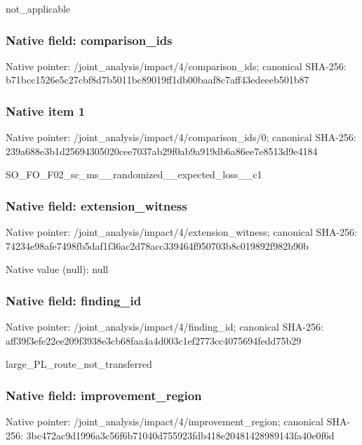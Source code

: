 \documentclass[10pt,a4paper]{article}
\begin{document}
\begingroup\raggedright\sloppy not\_\allowbreak{}applicable\par\endgroup

\subsubsection{Native field: comparison\_\allowbreak{}ids}
Native pointer: /joint\_\allowbreak{}analysis/impact/4/comparison\_\allowbreak{}ids; canonical SHA-256: b71bcc1526e5c27cbf8d7b5011bc89019ff1db00baaf8c7aff43edeeeb501b87

\subsubsection{Native item 1}
Native pointer: /joint\_\allowbreak{}analysis/impact/4/comparison\_\allowbreak{}ids/0; canonical SHA-256: 239a688e3b1d25694305020cee7037ab29f0ab9a919db6a86ee7e8513d9e4184

\begingroup\raggedright\sloppy SO\_\allowbreak{}FO\_\allowbreak{}F02\_\allowbreak{}sc\_\allowbreak{}ms\_\allowbreak{}\_\allowbreak{}randomized\_\allowbreak{}\_\allowbreak{}expected\_\allowbreak{}loss\_\allowbreak{}\_\allowbreak{}c1\par\endgroup

\subsubsection{Native field: extension\_\allowbreak{}witness}
Native pointer: /joint\_\allowbreak{}analysis/impact/4/extension\_\allowbreak{}witness; canonical SHA-256: 74234e98afe7498fb5daf1f36ac2d78acc339464f950703b8c019892f982b90b

Native value (null): null

\subsubsection{Native field: finding\_\allowbreak{}id}
Native pointer: /joint\_\allowbreak{}analysis/impact/4/finding\_\allowbreak{}id; canonical SHA-256: aff39f3efe22ee209f3938e3cb68faa4a4d003c1ef2773cc4075694fedd75b29

\begingroup\raggedright\sloppy large\_\allowbreak{}PL\_\allowbreak{}route\_\allowbreak{}not\_\allowbreak{}transferred\par\endgroup

\subsubsection{Native field: improvement\_\allowbreak{}region}
Native pointer: /joint\_\allowbreak{}analysis/impact/4/improvement\_\allowbreak{}region; canonical SHA-256: 3bc472ac9d1996a3c56f6b71040d755923fdb418e20481428989143fa40e0f6d
\end{document}
